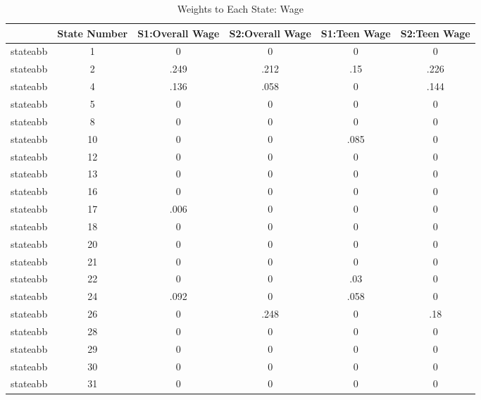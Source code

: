 \begin{table}[htbp]\centering
\caption{Weights to Each State: Wage}
\begin{tabular}{l*{5}{c}}
\toprule
            &State Number&S1:Overall Wage&S2:Overall Wage&S1:Teen Wage&S2:Teen Wage\\
\midrule
stateabb    &           1&           0&           0&           0&           0\\
stateabb    &           2&        .249&        .212&         .15&        .226\\
stateabb    &           4&        .136&        .058&           0&        .144\\
stateabb    &           5&           0&           0&           0&           0\\
stateabb    &           8&           0&           0&           0&           0\\
stateabb    &          10&           0&           0&        .085&           0\\
stateabb    &          12&           0&           0&           0&           0\\
stateabb    &          13&           0&           0&           0&           0\\
stateabb    &          16&           0&           0&           0&           0\\
stateabb    &          17&        .006&           0&           0&           0\\
stateabb    &          18&           0&           0&           0&           0\\
stateabb    &          20&           0&           0&           0&           0\\
stateabb    &          21&           0&           0&           0&           0\\
stateabb    &          22&           0&           0&         .03&           0\\
stateabb    &          24&        .092&           0&        .058&           0\\
stateabb    &          26&           0&        .248&           0&         .18\\
stateabb    &          28&           0&           0&           0&           0\\
stateabb    &          29&           0&           0&           0&           0\\
stateabb    &          30&           0&           0&           0&           0\\
stateabb    &          31&           0&           0&           0&           0\\

\end{tabular}
\end{table}
